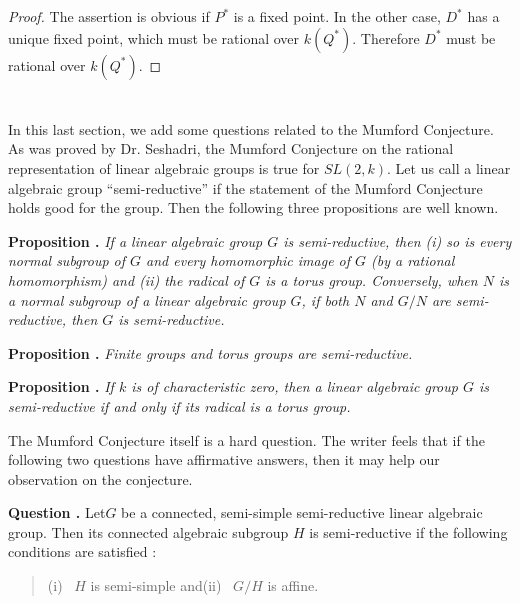 \begin{proof}
The assertion is obvious if $P^{*}$ is a fixed point. In the other case, $D^{*}$ has a unique fixed point, which must be rational over $k(Q^{*})$. Therefore $D^{*}$ must be rational over $k(Q^{*})$.
\end{proof}

\section{}\label{art16-sec5}
In this last section, we add some questions related to the Mumford Conjecture. As was proved by Dr. Seshadri, the Mumford Conjecture on the rational representation of linear algebraic groups is true for $SL(2,k)$. Let us call a linear algebraic group ``semi-reductive'' if the statement of the Mumford Conjecture holds good for the group. Then the following three propositions are well known.

\medskip
\noindent
{\bf Proposition .\label{art16-prop5.1}}
{\em If a linear algebraic group $G$ is semi-reductive, then {\rm(i)} so is every normal subgroup of $G$ and every homomorphic image of $G$ (by a rational homomorphism) and {\rm(ii)} the radical of $G$ is a torus group. Conversely, when $N$ is a normal subgroup of a linear algebraic group $G$, if both $N$ and $G/N$ are semi-reductive, then $G$ is semi-reductive.}

\medskip
\noindent
{\bf Proposition .\label{art16-prop5.2}}
{\em Finite groups and torus groups are semi-reductive.}

\medskip
\noindent
{\bf Proposition .\label{art16-prop5.3}}
{\em If $k$ is of characteristic zero, then a linear algebraic group $G$ is semi-reductive if and only if its radical is a torus group.}
\smallskip

The Mumford Conjecture itself is a hard question. The writer feels that if the following two questions have affirmative answers, then it may help our observation on the conjecture.

\eject

\noindent
{\bf Question .\label{art16-ques5.4}}
Let\pageoriginale $G$ be a connected, semi-simple semi-reductive linear algebraic group. Then its connected algebraic subgroup $H$ is semi-reductive if the following conditions are satisfied :
\begin{quote}
(i)~ $H$ is semi-simple and\qquad (ii)~ $G/H$ is affine.
\end{quote}

